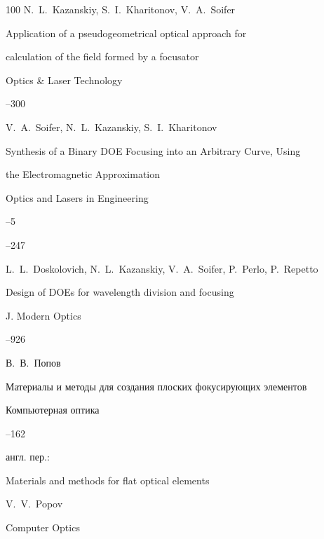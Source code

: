 \begin{thebibliography}{100}
\by  N.~L.~Kazanskiy, S.~I.~Kharitonov, V.~A.~Soifer

\paper Application of a pseudogeometrical optical approach for

calculation of the field formed by a focusator

\jour Optics \& Laser Technology




--300




\by V.~A.~Soifer, N.~L.~Kazanskiy, S.~I.~Kharitonov

\paper Synthesis of a Binary DOE Focusing into an Arbitrary Curve, Using

the Electromagnetic Approximation

\jour Optics and Lasers in Engineering



--5

--247




\by L.~L.~Doskolovich, N.~L.~Kazanskiy, V.~A.~Soifer, P.~Perlo, P.~Repetto

\paper Design of DOEs for wavelength division and focusing

\jour J. Modern Optics




--926




\by В.~В.~Попов

\paper Материалы и методы для создания плоских фокусирующих элементов

\jour Компьютерная оптика



--162

\transl англ. пер.:~

\paper Materials and methods for flat optical elements

\by V.~V.~Popov

\jour Computer Optics


\end{thebibliography}
